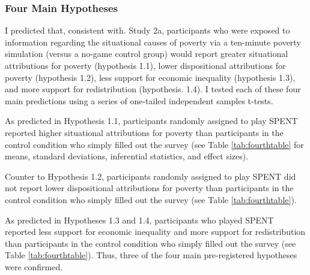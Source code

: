 \documentclass{sfuthesis}
\begin{document}
\subsubsection{Four Main Hypotheses}

I predicted that, consistent with. Study 2a, participants who were exposed to information regarding the situational causes of poverty via a ten-minute poverty simulation (versus a no-game control group) would report greater situational attributions for poverty (hypothesis 1.1), lower dispositional attributions for poverty (hypothesis 1.2), less support for economic inequality (hypothesis 1.3), and more support for redistribution (hypothesis. 1.4). I tested each of these four main predictions using a series of one-tailed independent samples t-tests. 

As predicted in Hypothesis 1.1, participants randomly assigned to play SPENT reported higher situational attributions for poverty than participants in the control condition who simply filled out the survey (see Table \ref{tab:fourthtable} for means, standard deviations, inferential statistics, and effect sizes). 

Counter to Hypothesis 1.2, participants randomly assigned to play SPENT did not report lower dispositional attributions for poverty than participants in the control condition who simply filled out the survey (see Table \ref{tab:fourthtable}). 

As predicted in Hypotheses 1.3 and 1.4, participants who played SPENT reported less support for economic inequality and more support for redistribution than participants in the control condition who simply filled out the survey (see Table \ref{tab:fourthtable}). Thus, three of the four main pre-registered hypotheses were confirmed.
\end{document}
